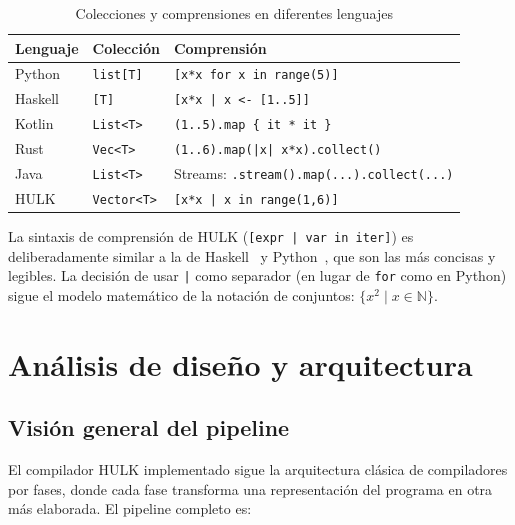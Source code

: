 \documentclass[12pt, a4paper]{article}
\begin{document}
\begin{table}[h!]
\centering
\caption{Colecciones y comprensiones en diferentes lenguajes}
\label{tab:vec-compare}
\begin{tabularx}{\textwidth}{@{}lXX@{}}
\toprule
\textbf{Lenguaje} & \textbf{Colección} & \textbf{Comprensión} \\
\midrule
Python~\cite{warsaw2000} & \texttt{list[T]} & \texttt{[x*x for x in range(5)]} \\
Haskell~\cite{marlow2010} & \texttt{[T]} & \texttt{[x*x | x <- [1..5]]} \\
Kotlin~\cite{jemerov2017} & \texttt{List<T>} & \texttt{(1..5).map \{ it * it \}} \\
Rust~\cite{klabnik2019} & \texttt{Vec<T>} & \texttt{(1..6).map(|x| x*x).collect()} \\
Java~\cite{gosling2021} & \texttt{List<T>} & Streams: \texttt{.stream().map(...).collect(...)} \\
HULK & \texttt{Vector<T>} & \texttt{[x*x | x in range(1,6)]} \\
\bottomrule
\end{tabularx}
\end{table}

La sintaxis de comprensión de HULK (\texttt{[expr | var in iter]}) es
deliberadamente similar a la de Haskell~\cite{marlow2010} y Python~\cite{warsaw2000}, que son las más concisas
y legibles. La decisión de usar \texttt{|} como separador (en lugar de
\texttt{for} como en Python) sigue el modelo matemático de la notación
de conjuntos: $\{x^2 \mid x \in \mathbb{N}\}$.

\newpage


\section{An\'{a}lisis de dise\~{n}o y arquitectura}
\label{sec:arquitectura}

\subsection{Visi\'{o}n general del pipeline}

El compilador HULK implementado sigue la arquitectura cl\'{a}sica de compiladores
por fases, donde cada fase transforma una representaci\'{o}n del programa en otra
m\'{a}s elaborada. El pipeline completo es:
\end{document}
